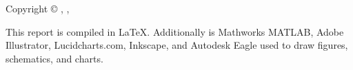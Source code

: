 \thispagestyle{empty}
{\small
\strut\vfill %
\noindent Copyright \copyright{} \projectGroup{}, \projectFaculty{} \projectSemester{}, \AAU{} \the\year\par
\vspace{0.2cm}
\noindent This report is compiled in \LaTeX. Additionally is Mathworks MATLAB, Adobe Illustrator, Lucidcharts.com, Inkscape, and Autodesk Eagle used to draw figures, schematics, and charts.
}
\clearpage
